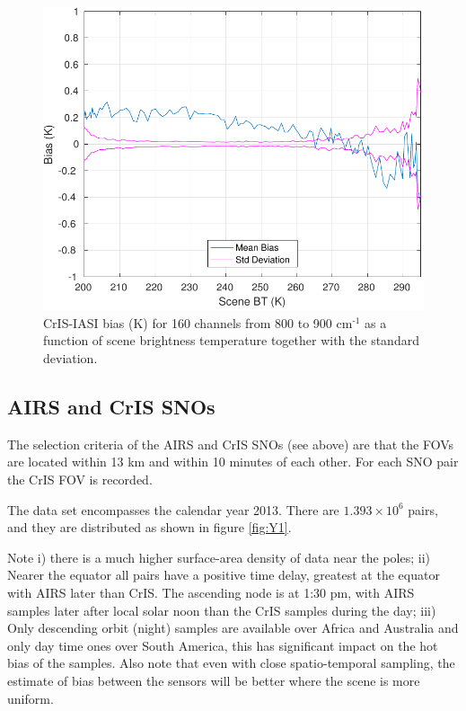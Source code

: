 \documentclass[twocolumn,10pt]{article}
\begin{document}
\begin{figure}[htb]
\centering
\includegraphics[width=\linewidth]{./figs/IC_jplSNO_Bias_std_160LWchns_vsScene.pdf}
\caption{\label{fig:orgparagraph9}
  CrIS-IASI bias (K) for 160 channels from 800 to 900 cm\(^{\text{-1}}\) as a function of scene brightness temperature together with the standard deviation.}
\label{fig:X8}
\end{figure}


\subsection{AIRS and CrIS SNOs}
\label{sec:orgheadline9}

The selection criteria of the AIRS and CrIS SNOs (see above) are that the FOVs are located
within 13 km and within 10 minutes of each other. For each SNO pair the CrIS FOV is recorded. 

The data set encompasses the calendar year 2013. There are $1.393\times 10^{6}$ pairs, and they are distributed as shown in figure \ref{fig:Y1}.

Note i) there is a much higher surface-area density of data near the poles; 
ii) Nearer the equator all pairs have a positive time delay, greatest at the equator with AIRS later than CrIS. The ascending node is at 1:30 pm, with
AIRS samples later after local solar noon than the CrIS samples during the day; 
iii) Only descending orbit (night) samples are available over Africa and Australia and only day time ones over South America, this has significant impact on the hot bias of the samples. Also note that even with close spatio-temporal sampling, the estimate of bias between the sensors will be better where the scene is more uniform.
\end{document}
